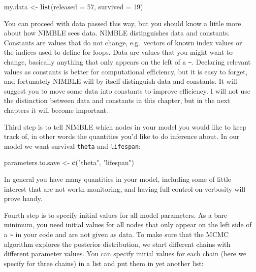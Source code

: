 \documentclass[
  12pt,
]{krantz}
\newenvironment{Shaded}{\begin{snugshade}}{\end{snugshade}}
\newcommand{\AttributeTok}[1]{\textcolor[rgb]{0.13,0.29,0.53}{#1}}
\newcommand{\DecValTok}[1]{\textcolor[rgb]{0.00,0.00,0.81}{#1}}
\newcommand{\FunctionTok}[1]{\textcolor[rgb]{0.13,0.29,0.53}{\textbf{#1}}}
\newcommand{\NormalTok}[1]{#1}
\newcommand{\OtherTok}[1]{\textcolor[rgb]{0.56,0.35,0.01}{#1}}
\newcommand{\StringTok}[1]{\textcolor[rgb]{0.31,0.60,0.02}{#1}}
\begin{document}
\begin{Shaded}
\begin{Highlighting}[]
\NormalTok{my.data }\OtherTok{\textless{}{-}} \FunctionTok{list}\NormalTok{(}\AttributeTok{released =} \DecValTok{57}\NormalTok{, }\AttributeTok{survived =} \DecValTok{19}\NormalTok{)}
\end{Highlighting}
\end{Shaded}

You can proceed with data passed this way, but you should know a little more about how NIMBLE sees data. NIMBLE distinguishes data and constants. Constants are values that do not change, e.g.~vectors of known index values or the indices used to define for loops. Data are values that you might want to change, basically anything that only appears on the left of a \texttt{\textasciitilde{}}. Declaring relevant values as constants is better for computational efficiency, but it is easy to forget, and fortunately NIMBLE will by itself distinguish data and constants. It will suggest you to move some data into constants to improve efficiency. I will not use the distinction between data and constants in this chapter, but in the next chapters it will become important.

Third step is to tell NIMBLE which nodes in your model you would like to keep track of, in other words the quantities you'd like to do inference about. In our model we want survival \texttt{theta} and \texttt{lifespan}:

\begin{Shaded}
\begin{Highlighting}[]
\NormalTok{parameters.to.save }\OtherTok{\textless{}{-}} \FunctionTok{c}\NormalTok{(}\StringTok{"theta"}\NormalTok{, }\StringTok{"lifespan"}\NormalTok{)}
\end{Highlighting}
\end{Shaded}

In general you have many quantities in your model, including some of little interest that are not worth monitoring, and having full control on verbosity will prove handy.

Fourth step is to specify initial values for all model parameters. As a bare minimum, you need initial values for all nodes that only appear on the left side of a \texttt{\textasciitilde{}} in your code and are not given as data. To make sure that the MCMC algorithm explores the posterior distribution, we start different chains with different parameter values. You can specify initial values for each chain (here we specify for three chains) in a list and put them in yet another list:
\end{document}

